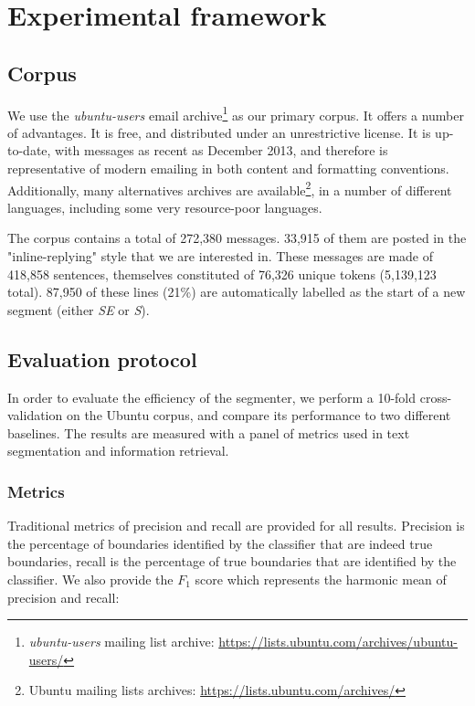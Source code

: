 
\section{Experimental framework}

\subsection{Corpus}

We use the \textit{ubuntu-users} email archive\footnote{\textit{ubuntu-users} mailing list archive: \url{https://lists.ubuntu.com/archives/ubuntu-users/}} as our primary corpus. It offers a number of advantages. It is free, and distributed under an unrestrictive license. It is up-to-date, with messages as recent as December 2013, and therefore is representative of modern emailing in both content and formatting conventions. Additionally, many alternatives archives are available\footnote{Ubuntu mailing lists archives: \url{https://lists.ubuntu.com/archives/}}, in a number of different languages, including some very resource-poor languages.

The corpus contains a total of 272,380 messages. 33,915 of them are posted in the "inline-replying" style that we are interested in. These messages are made of 418,858 sentences, themselves constituted of 76,326 unique tokens (5,139,123 total). 87,950 of these lines (21\%) are automatically labelled as the start of a new segment (either \textit{SE} or \textit{S}).

\subsection{Evaluation protocol}

In order to evaluate the efficiency of the segmenter, we perform a 10-fold cross-validation on the Ubuntu corpus, and compare its performance to two different baselines. The results are measured with a panel of metrics used in text segmentation and information retrieval.

\subsubsection{Metrics}

Traditional metrics of precision and recall are provided for all results. Precision is the percentage of boundaries identified by the classifier that are indeed true boundaries, recall is the percentage of true boundaries that are identified by the classifier. We also provide the $F_1$ score which represents the harmonic mean of precision and recall:

